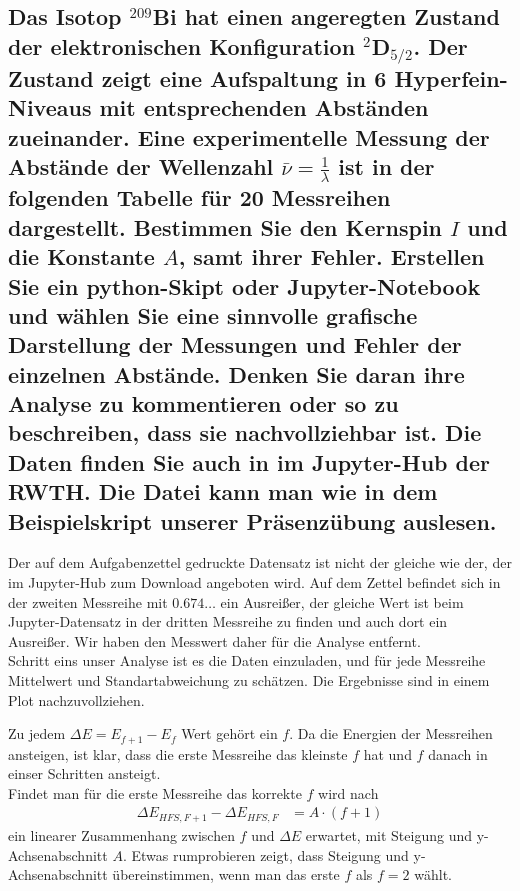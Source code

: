 \documentclass[ex, minted]{exercise_4.0}
\begin{document}
\subsection{Das Isotop \({}^{209}\)Bi hat einen angeregten Zustand der elektronischen Konfiguration \({}^2\)D\(_{5/2}\). Der Zustand zeigt eine Aufspaltung in 6 Hyperfein-Niveaus mit entsprechenden Abständen zueinander. Eine experimentelle Messung der Abstände der Wellenzahl \(\bar \nu =\frac1\lambda\) ist in der folgenden Tabelle für 20 Messreihen dargestellt. Bestimmen Sie den Kernspin \(I\) und die Konstante \(A\), samt ihrer Fehler. Erstellen Sie ein python-Skipt oder Jupyter-Notebook und wählen Sie eine sinnvolle grafische Darstellung der Messungen und Fehler der einzelnen Abstände. Denken Sie daran ihre Analyse zu kommentieren oder so zu beschreiben, dass sie nachvollziehbar ist. Die Daten finden Sie auch in  im Jupyter-Hub der RWTH. Die Datei kann man wie in dem Beispielskript unserer Präsenzübung auslesen.}

\dottedlinett

Der auf dem Aufgabenzettel gedruckte Datensatz ist nicht der gleiche wie der, der im Jupyter-Hub zum Download angeboten wird. Auf dem Zettel befindet sich in der zweiten Messreihe mit \(0.674\dots\) ein Ausreißer, der gleiche Wert ist beim Jupyter-Datensatz in der dritten Messreihe zu finden und auch dort ein Ausreißer. Wir haben den Messwert daher für die Analyse entfernt. \\

Schritt eins unser Analyse ist es die Daten einzuladen, und für jede Messreihe Mittelwert und Standartabweichung zu schätzen. Die Ergebnisse sind in einem Plot nachzuvollziehen.




Zu jedem \(\Delta E = E_{f+1}-E_f\) Wert gehört ein \(f\). Da die Energien der Messreihen ansteigen, ist klar, dass die erste Messreihe das kleinste \(f\) hat und \(f\) danach in einser Schritten ansteigt. \\

Findet man für die erste Messreihe das korrekte \(f\) wird nach 
\begin{align*}
    \Delta E_{HFS,F+1} - \Delta E_{HFS,F} &= A\cdot (f+1)
\end{align*}
ein linearer Zusammenhang zwischen \(f\) und \(\Delta E\) erwartet, mit Steigung und y-Achsenabschnitt \(A\). Etwas rumprobieren zeigt, dass Steigung und y-Achsenabschnitt übereinstimmen, wenn man das erste \(f\) als \(f=2\) wählt. 
\end{document}
